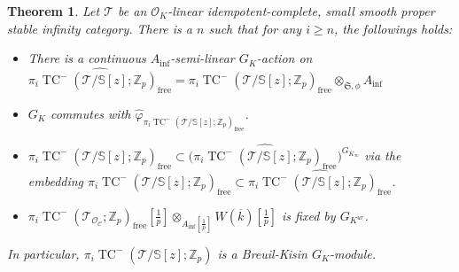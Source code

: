 \documentclass[11pt]{amsart}
\newcommand{\Z}{\mathbb{Z}}
\newcommand{\sO}{\mathcal{O}}
\newcommand{\sT}{\mathcal{T}}
\newcommand{\bS}{\mathbb{S}}
\newcommand{\free}{\operatorname{{free}}}
\newcommand{\TCn}{\operatorname{TC}^{-}}
\newcommand{\ol}{\overline}
\newcommand{\Ainf}{A_{\operatorname{inf}}}
\newcommand{\Cu}{\mathcal{C}}
\newcommand{\mS}{\mathfrak{S}}
\newtheorem{thm}[lemma]{Theorem}
\theoremstyle{definition}
\theoremstyle{remark}
\numberwithin{equation}{section}
\begin{document}
\begin{thm}\label{BKGKmodulethm}
  Let $\sT$ be an $\sO_K$-linear idempotent-complete, small smooth proper stable infinity category. There is a $n$ such that for any $i\geq n$, the followings holds:
  \begin{itemize}
    \item[(1)] There is a continuous $\Ainf$-semi-linear $G_K$-action on $\widehat{\pi_i\TCn(\sT/\bS[z];\Z_p)_{\free}}=\pi_i\TCn(\sT/\bS[z];\Z_p)_{\free}\otimes_{\mS,\phi}\Ainf$
    \item[(2)] $G_K$ commutes with $\widehat{\varphi}_{\pi_i \TCn(\sT/\bS[z];\Z_p)_{\free}}$.
    \item[(3)] $\pi_i \TCn(\sT/\bS[z];\Z_p)_{\free} \subset \bigl(\widehat{\pi_i \TCn(\sT/\bS[z];\Z_p)_{\free}}\bigr)^{G_{K_\infty}}$ via the embedding $\pi_i \TCn(\sT/\bS[z];\Z_p)_{\free} \subset \widehat{\pi_i \TCn(\sT/\bS[z];\Z_p)_{\free}}$. 
    \item[(4)] $\pi_i\TCn(\sT_{\sO_\Cu};\Z_p)_{\free}[\frac{1}{p}]\otimes_{\Ainf[\frac{1}{p}]} W(\ol{k})[\frac{1}{p}]$ is fixed by $G_{K^{ur}}$.
  \end{itemize}
  In particular, $\pi_i \TCn(\sT/\bS[z];\Z_p)$ is a Breuil-Kisin $G_K$-module.
\end{thm}
\end{document}
